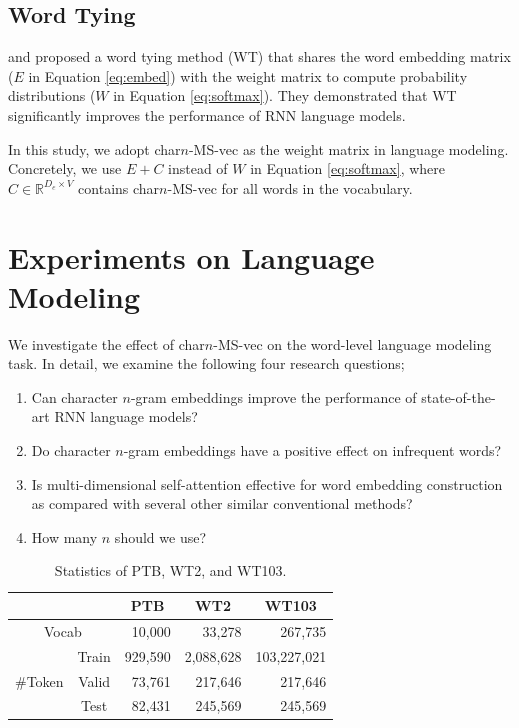 \documentclass[letterpaper]{article} %
\begin{document}
\subsection{Word Tying}
\cite{DBLP:journals/corr/InanKS16} and \cite{press-wolf:2017:EACLshort} proposed a word tying method (WT) that shares the word embedding matrix ($E$ in Equation \ref{eq:embed}) with the weight matrix to compute probability distributions ($W$ in Equation \ref{eq:softmax}).
They demonstrated that WT significantly improves the performance of RNN language models.

In this study, we adopt char$n$-MS-vec as the weight matrix in language modeling.
Concretely, we use $E + C$ instead of $W$ in Equation \ref{eq:softmax}, where $C \in \mathbb{R}^{D_e \times V}$ contains char$n$-MS-vec for all words in the vocabulary.


\section{Experiments on Language Modeling}

We investigate the effect of char$n$-MS-vec on the word-level language modeling task.
In detail, we examine the following four research questions;
\begin{enumerate}
  \item Can character $n$-gram embeddings improve the performance of state-of-the-art RNN language models?
  \item Do character $n$-gram embeddings have a positive effect on infrequent words?
  \item Is multi-dimensional self-attention effective for word embedding construction as compared with several other similar conventional methods?
  \item How many $n$ should we use?
\end{enumerate}


\begin{table}[!t]
  \centering
  \small
  \begin{tabular}{ c c | r | r | r }
  \toprule
  \multicolumn{2}{c|}{} & \multicolumn{1}{c|}{PTB} & \multicolumn{1}{c|}{WT2} & \multicolumn{1}{c}{WT103} \\
  \midrule
  \multicolumn{2}{c|}{Vocab} & 10,000 & 33,278 & 267,735 \\
  \midrule
   & Train & 929,590 & 2,088,628 & 103,227,021 \\
   \#Token & Valid & 73,761 & 217,646 & 217,646 \\
   & Test & 82,431 & 245,569 & 245,569 \\
  \bottomrule
  \end{tabular}
  \caption{Statistics of PTB, WT2, and WT103.\label{tab:dataset}}
\end{table}
\end{document}

